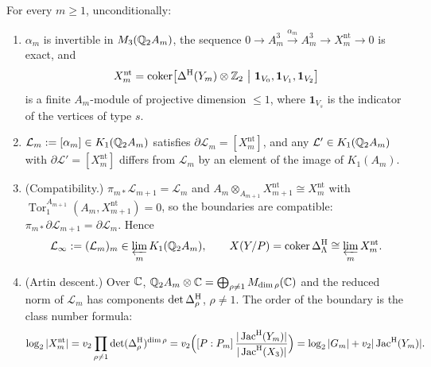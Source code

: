 \begin{theorem}\label{V3P6:thm:pro2}
For every $m\ge1$, unconditionally:
\begin{enumerate}
\item[(i)] $\alpha_m$ is invertible in $M_3(\mathbb{Q}_2A_m)$, the sequence
$0\to A_m^{3}\xrightarrow{\alpha_m}A_m^{3}\to X_m^{\mathrm{nt}}\to0$ is exact, and
\[
X_m^{\mathrm{nt}}=\coker\bigl[\DeltaH(Y_m)\otimes\Z_2\ \big|\ \mathbf 1_{V_0},\mathbf 1_{V_1},
\mathbf 1_{V_2}\bigr]
\]
is a finite $A_m$-module of projective dimension $\le1$, where $\mathbf 1_{V_s}$ is the indicator
of the vertices of type $s$.
\item[(ii)] $\mathcal L_m:=[\alpha_m]\in K_1(\mathbb{Q}_2A_m)$ satisfies $\partial\mathcal L_m=[X_m^{\mathrm{nt}}]$,
and any $\mathcal L'\in K_1(\mathbb{Q}_2A_m)$ with $\partial\mathcal L'=[X_m^{\mathrm{nt}}]$ differs from
$\mathcal L_m$ by an element of the image of $K_1(A_m)$.
\item[(iii)] (Compatibility.) $\pi_{m*}\mathcal L_{m+1}=\mathcal L_m$ and
$A_m\otimes_{A_{m+1}}X_{m+1}^{\mathrm{nt}}\cong X_m^{\mathrm{nt}}$ with
$\operatorname{Tor}_1^{A_{m+1}}(A_m,X_{m+1}^{\mathrm{nt}})=0$, so the boundaries are compatible:
$\pi_{m*}\partial\mathcal L_{m+1}=\partial\mathcal L_m$. Hence
\[
\mathcal L_\infty:=(\mathcal L_m)_m\in\varprojlim_mK_1(\mathbb{Q}_2A_m),\qquad
X(Y/P)=\operatorname{coker}\Delta^{\mathrm{H}}_\Lambda\cong\varprojlim_mX_m^{\mathrm{nt}} .
\]
\item[(iv)] (Artin descent.) Over $\mathbb{C}$, $\mathbb{Q}_2A_m\otimes\mathbb{C}=\bigoplus_{\rho\ne1}M_{\dim\rho}(\mathbb{C})$ and
the reduced norm of $\mathcal L_m$ has components $\det\Delta^{\mathrm{H}}_\rho$, $\rho\ne1$. The order of the
boundary is the class number formula:
\[
\log_2|X_m^{\mathrm{nt}}|=v_2\prod_{\rho\ne1}\det(\Delta^{\mathrm{H}}_\rho)^{\dim\rho}
=v_2\Bigl([P:P_m]\,\frac{|\operatorname{Jac}^{\mathrm{H}}(Y_m)|}{|\operatorname{Jac}^{\mathrm{H}}(X_3)|}\Bigr)
=\log_2|G_m|+v_2|\operatorname{Jac}^{\mathrm{H}}(Y_m)| .
\]
\end{enumerate}
\end{theorem}

